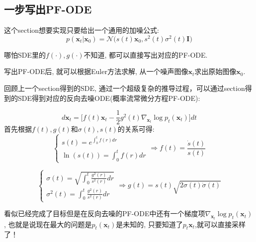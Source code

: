 \subsection{一步写出PF-ODE}

这个section想要实现只要给出一个通用的加噪公式:
$$
p(\mathbf{x}_{t}|\mathbf{x}_{0})=
\mathcal{N}\bigg(s(t)\mathbf{x}_{0}, s^{2}(t)\sigma^{2}(t)\mathbf{I}\bigg)
$$

哪怕SDE里的$f(\cdot ), g(\cdot)$不知道, 都可以直接写出对应的PF-ODE.

写出PF-ODE后, 就可以根据Euler方法求解, 从一个噪声图像$\mathbf{x}_{t}$求出原始图像$\mathbf{x}_{0}$.

\hspace*{\fill}

回顾上一个section得到的SDE, 通过一个超级复杂的推导过程，可以通过section得到的SDE得到对应的反向去噪ODE(概率流常微分方程PF-ODE):

$$
d\mathbf{x}_{t}=\bigg[f(t)\mathbf{x}_{t}-\frac{1}{2}g^{2}(t)\nabla_{\mathbf{x}_{t}}\log p_{t}(\mathbf{x}_{t})\bigg]dt
$$
首先根据$f(t), g(t)$和$\sigma(t), s(t)$的关系可得:
$$
\begin{cases}
s(t)=e^{\int_{0}^{t}f(r)dr}\\
\ln(s(t))=\int_{0}^{t}f(r)dr
\end{cases}\Longrightarrow
f(t)=\frac{\dot{s}(t)}{s(t)}
$$

$$
\begin{cases}
    \sigma(t)=\sqrt{\int_{0}^{t}\frac{g^{2}(r)}{s^{2}(r)}dr} \\
    \sigma^{2}(t)=\int_{0}^{t}\frac{g^{2}(r)}{s^{2}(r)}dr
\end{cases}\Longrightarrow
g(t)=s(t)\sqrt{2\sigma(t)\dot{\sigma}(t)}
$$

看似已经完成了目标但是在反向去噪的PF-ODE中还有一个梯度项$\nabla_{\mathbf{x}_{t}}\log p_{t}(\mathbf{x}_{t})$,
也就是说现在最大的问题是$p_{t}(\mathbf{x}_{t})$是未知的, 只要知道了$p_{t}\mathbf{x}_{t}$,就可以直接采样了！

